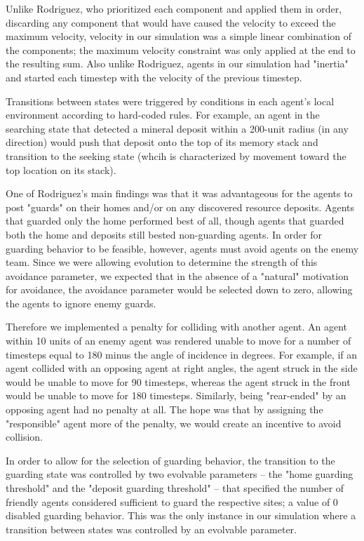 \documentclass[12pt,journal,compsoc]{IEEEtran}
\begin{document}
Unlike Rodriguez, who prioritized each component and applied them in order, discarding any component that would have caused the velocity to exceed the maximum velocity, velocity in our simulation was a simple linear combination of the components; the maximum velocity constraint was only applied at the end to the resulting sum. Also unlike Rodriguez, agents in our simulation had "inertia" and started each timestep with the velocity of the previous timestep.

Transitions between states were triggered by conditions in each agent's local environment according to hard-coded rules. For example, an agent in the searching state that detected a mineral deposit within a 200-unit radius (in any direction) would push that deposit onto the top of its memory stack and transition to the seeking state (whcih is characterized by movement toward the top location on its stack).

One of Rodriguez's main findings was that it was advantageous for the agents to post "guards" on their homes and/or on any discovered resource deposits. Agents that guarded only the home performed best of all, though agents that guarded both the home and deposits still bested non-guarding agents. In order for guarding behavior to be feasible, however, agents must avoid agents on the enemy team. Since we were allowing evolution to determine the strength of this avoidance parameter, we expected that in the absence of a "natural" motivation for avoidance, the avoidance parameter would be selected down to zero, allowing the agents to ignore enemy guards.

Therefore we implemented a penalty for colliding with another agent. An agent within 10 units of an enemy agent was rendered unable to move for a number of timesteps equal to 180 minus the angle of incidence in degrees. For example, if an agent collided with an opposing agent at right angles, the agent struck in the side would be unable to move for 90 timesteps, whereas the agent struck in the front would be unable to move for 180 timesteps. Similarly, being "rear-ended" by an opposing agent had no penalty at all. The hope was that by assigning the "responsible" agent more of the penalty, we would create an incentive to avoid collision.

In order to allow for the selection of guarding behavior, the transition to the guarding state was controlled by two  evolvable parameters -- the "home guarding threshold" and the "deposit guarding threshold" -- that specified the number of friendly agents considered sufficient to guard the respective sites; a value of 0 disabled guarding behavior. This was the only instance in our simulation where a transition between states was controlled by an evolvable parameter.
\end{document}
